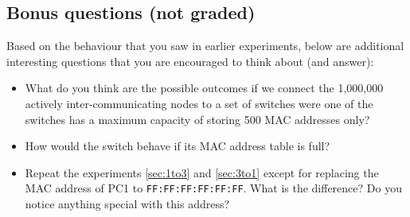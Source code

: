 \documentclass[pdftex,12pt,a4paper]{article}
\begin{document}
        \subsection{Bonus questions (not graded)}
            Based on the behaviour that you saw in earlier experiments, below
            are additional interesting questions that you are encouraged to
            think about (and answer):
            \begin{itemize}
                \item What do you think are the possible outcomes if we connect
                the 1,000,000 actively inter-communicating nodes to a set of switches
                were one of the switches has a maximum capacity of storing 500
                MAC addresses only?
                \item How would the switch behave if its MAC address table is
                full?
                \item Repeat the experiments \ref{sec:1to3} and \ref{sec:3to1}
                except for replacing the MAC address of PC1 to
                \texttt{FF:FF:FF:FF:FF:FF}. What is the difference? Do you
                notice anything special with this address?
            \end{itemize}
\end{document}
